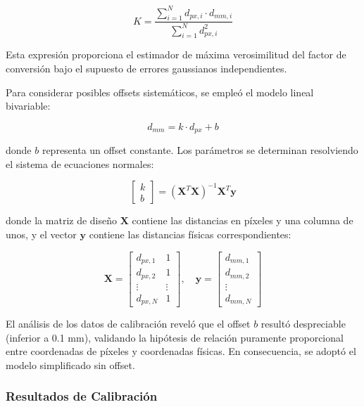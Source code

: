 \begin{equation}
K = \frac{\sum_{i=1}^{N} d_{px,i} \cdot d_{mm,i}}{\sum_{i=1}^{N} d_{px,i}^2}
\end{equation}

Esta expresión proporciona el estimador de máxima verosimilitud del factor de conversión bajo el supuesto de errores gaussianos independientes.

Para considerar posibles offsets sistemáticos, se empleó el modelo lineal bivariable:

\begin{equation}
d_{mm} = k \cdot d_{px} + b
\end{equation}

donde $b$ representa un offset constante. Los parámetros se determinan resolviendo el sistema de ecuaciones normales:

\begin{equation}
\begin{bmatrix} k \\ b \end{bmatrix} = (\mathbf{X}^T\mathbf{X})^{-1}\mathbf{X}^T\mathbf{y}
\end{equation}

donde la matriz de diseño $\mathbf{X}$ contiene las distancias en píxeles y una columna de unos, y el vector $\mathbf{y}$ contiene las distancias físicas correspondientes:

\begin{equation}
\mathbf{X} = \begin{bmatrix}
d_{px,1} & 1 \\
d_{px,2} & 1 \\
\vdots & \vdots \\
d_{px,N} & 1
\end{bmatrix}, \quad
\mathbf{y} = \begin{bmatrix}
d_{mm,1} \\
d_{mm,2} \\
\vdots \\
d_{mm,N}
\end{bmatrix}
\end{equation}

El análisis de los datos de calibración reveló que el offset $b$ resultó despreciable (inferior a 0.1 mm), validando la hipótesis de relación puramente proporcional entre coordenadas de píxeles y coordenadas físicas. En consecuencia, se adoptó el modelo simplificado sin offset.

\subsubsection{Resultados de Calibración}

